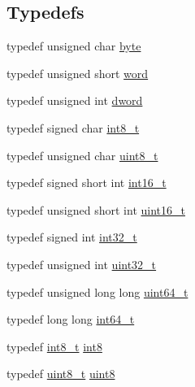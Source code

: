 \subsection*{Typedefs}
\begin{DoxyCompactItemize}
\item 
typedef unsigned char \hyperlink{a00038_a0c8186d9b9b7880309c27230bbb5e69d_a0c8186d9b9b7880309c27230bbb5e69d}{byte}
\item 
typedef unsigned short \hyperlink{a00038_a285e72252c100e2508e4e933a0738f2b_a285e72252c100e2508e4e933a0738f2b}{word}
\item 
typedef unsigned int \hyperlink{a00038_a855ebb1284efb85f8be57d819efa519a_a855ebb1284efb85f8be57d819efa519a}{dword}
\item 
typedef signed char \hyperlink{a00038_aef44329758059c91c76d334e8fc09700_aef44329758059c91c76d334e8fc09700}{int8\+\_\+t}
\item 
typedef unsigned char \hyperlink{a00038_aba7bc1797add20fe3efdf37ced1182c5_aba7bc1797add20fe3efdf37ced1182c5}{uint8\+\_\+t}
\item 
typedef signed short int \hyperlink{a00038_aa5ad9bec438b7cf669efb1ca064e79f5_aa5ad9bec438b7cf669efb1ca064e79f5}{int16\+\_\+t}
\item 
typedef unsigned short int \hyperlink{a00038_adf4d876453337156dde61095e1f20223_adf4d876453337156dde61095e1f20223}{uint16\+\_\+t}
\item 
typedef signed int \hyperlink{a00038_ab1967d8591af1a4e48c37fd2b0f184d0_ab1967d8591af1a4e48c37fd2b0f184d0}{int32\+\_\+t}
\item 
typedef unsigned int \hyperlink{a00038_a435d1572bf3f880d55459d9805097f62_a435d1572bf3f880d55459d9805097f62}{uint32\+\_\+t}
\item 
typedef unsigned long long \hyperlink{a00038_aaa5d1cd013383c889537491c3cfd9aad_aaa5d1cd013383c889537491c3cfd9aad}{uint64\+\_\+t}
\item 
typedef long long \hyperlink{a00038_a996e72f71b11a5bb8b3b7b6936b1516d_a996e72f71b11a5bb8b3b7b6936b1516d}{int64\+\_\+t}
\item 
typedef \hyperlink{a00038_aef44329758059c91c76d334e8fc09700_aef44329758059c91c76d334e8fc09700}{int8\+\_\+t} \hyperlink{a00038_aa79c2d3de4fcd200458c406f40b2ae64_aa79c2d3de4fcd200458c406f40b2ae64}{int8}
\item 
typedef \hyperlink{a00038_aba7bc1797add20fe3efdf37ced1182c5_aba7bc1797add20fe3efdf37ced1182c5}{uint8\+\_\+t} \hyperlink{a00038_a33a5e996e7a90acefb8b1c0bea47e365_a33a5e996e7a90acefb8b1c0bea47e365}{uint8}

\end{DoxyCompactItemize}
